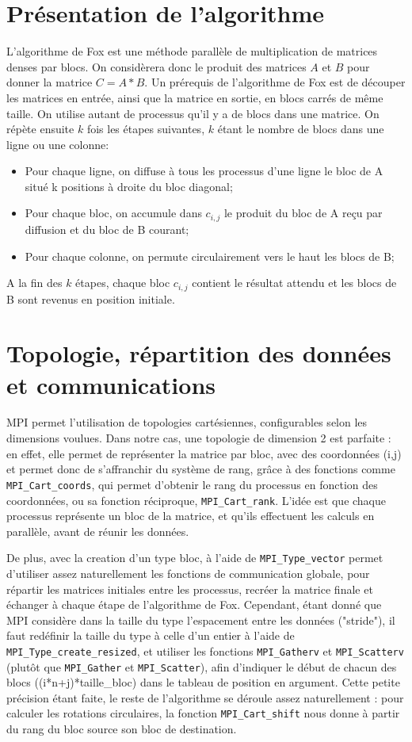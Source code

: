 \documentclass[a4paper,11pt]{article}
\begin{document}
\section{Présentation de l'algorithme}
L'algorithme de Fox est une méthode parallèle de multiplication de matrices denses par blocs. On considèrera donc le produit des matrices $A$ et $B$ pour donner la matrice $C=A*B$.
Un prérequis de l'algorithme de Fox est de découper les matrices en entrée, ainsi que la matrice en sortie, en blocs carrés de même taille. On utilise autant de processus qu'il y a de blocs dans une matrice.
On répète ensuite $k$ fois les étapes suivantes, $k$ étant le nombre de blocs dans une ligne ou une colonne:
\begin{itemize}
\item Pour chaque ligne, on diffuse à tous les processus d'une ligne le bloc de A situé k positions à droite du bloc diagonal;
\item Pour chaque bloc, on accumule dans $c_{i,j}$ le produit du bloc de A reçu par diffusion et du bloc de B courant;  
\item Pour chaque colonne, on permute circulairement vers le haut les blocs de B;
\end{itemize}

A la fin des $k$ étapes, chaque bloc $c_{i,j}$ contient le résultat attendu et les blocs de B sont revenus en position initiale.


\section{Topologie, répartition des données et communications}
MPI permet l'utilisation de topologies cartésiennes, configurables selon les dimensions voulues. Dans notre cas, une topologie de dimension 2 est parfaite : en effet, elle permet de représenter la matrice par bloc, avec des coordonnées (i,j) et permet donc de s'affranchir du système de rang, grâce à des fonctions comme \texttt{MPI_Cart_coords}, qui permet d'obtenir le rang du processus en fonction des coordonnées, ou sa fonction réciproque, \texttt{MPI_Cart_rank}.
L'idée est que chaque processus représente un bloc de la matrice, et qu'ils effectuent les calculs en parallèle, avant de réunir les données.

De plus, avec la creation d'un type bloc, à l'aide de \texttt{MPI_Type_vector} permet d'utiliser assez naturellement les fonctions de communication globale, pour répartir les matrices initiales entre les processus, recréer la matrice finale et échanger à chaque étape de l'algorithme de Fox.
Cependant, étant donné que MPI considère dans la taille du type l'espacement entre les données ("stride"), il faut redéfinir la taille du type à celle d'un entier à l'aide de \texttt{MPI_Type_create_resized}, et utiliser  les fonctions \texttt{MPI_Gatherv} et \texttt{MPI_Scatterv} (plutôt que \texttt{MPI_Gather} et \texttt{MPI_Scatter}), afin d'indiquer le début de chacun des blocs ((i*n+j)*taille_bloc) dans le tableau de position en argument.
Cette petite précision étant faite, le reste de l'algorithme se déroule assez naturellement : pour calculer les rotations circulaires, la fonction \texttt{MPI_Cart_shift} nous donne à partir du rang du bloc source son bloc de destination.
\end{document}
